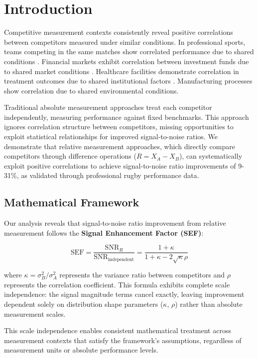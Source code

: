 \section{Introduction}

Competitive measurement contexts consistently reveal positive correlations between competitors measured under similar conditions. In professional sports, teams competing in the same matches show correlated performance due to shared conditions \cite{scott2023performance}. Financial markets exhibit correlation between investment funds due to shared market conditions \cite{carhart1997persistence}. Healthcare facilities demonstrate correlation in treatment outcomes due to shared institutional factors \cite{iezzoni1997risk}. Manufacturing processes show correlation due to shared environmental conditions.

Traditional absolute measurement approaches treat each competitor independently, measuring performance against fixed benchmarks. This approach ignores correlation structure between competitors, missing opportunities to exploit statistical relationships for improved signal-to-noise ratios. We demonstrate that relative measurement approaches, which directly compare competitors through difference operations ($R = X_A - X_B$), can systematically exploit positive correlations to achieve signal-to-noise ratio improvements of 9-31\%, as validated through professional rugby performance data.

\subsection{Mathematical Framework}

Our analysis reveals that signal-to-noise ratio improvement from relative measurement follows the \textbf{Signal Enhancement Factor (SEF)}:

$$\text{SEF} = \frac{\text{SNR}_R}{\text{SNR}_{\text{independent}}} = \frac{1 + \kappa}{1 + \kappa - 2\sqrt{\kappa}\rho}$$

where $\kappa = \sigma^2_B/\sigma^2_A$ represents the variance ratio between competitors and $\rho$ represents the correlation coefficient. This formula exhibits complete scale independence: the signal magnitude terms cancel exactly, leaving improvement dependent solely on distribution shape parameters ($\kappa$, $\rho$) rather than absolute measurement scales.

This scale independence enables consistent mathematical treatment across measurement contexts that satisfy the framework's assumptions, regardless of measurement units or absolute performance levels.

